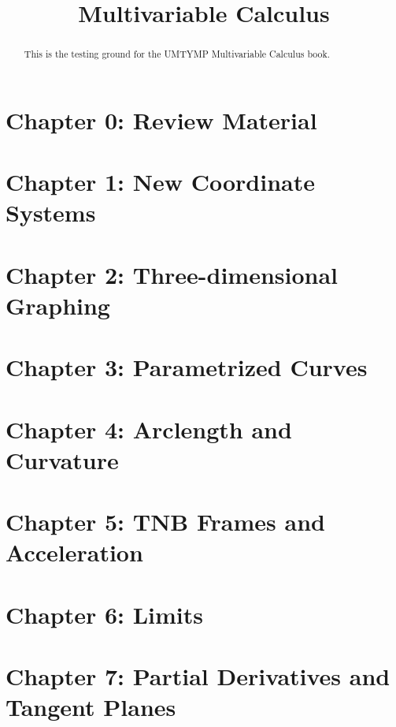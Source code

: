 \documentclass{xourse}
\title{Multivariable Calculus}
\begin{document}
  
\begin{abstract} %
This is the testing ground for the UMTYMP Multivariable Calculus book.  
\end{abstract}  
\maketitle  
 
\part{Chapter 0: Review Material}

\part{Chapter 1: New Coordinate Systems}

\part{Chapter 2: Three-dimensional Graphing}

\part{Chapter 3: Parametrized Curves}

\part{Chapter 4: Arclength and Curvature}

\part{Chapter 5: TNB Frames and Acceleration}

\part{Chapter 6: Limits}

\part{Chapter 7: Partial Derivatives and Tangent Planes}
\end{document}
